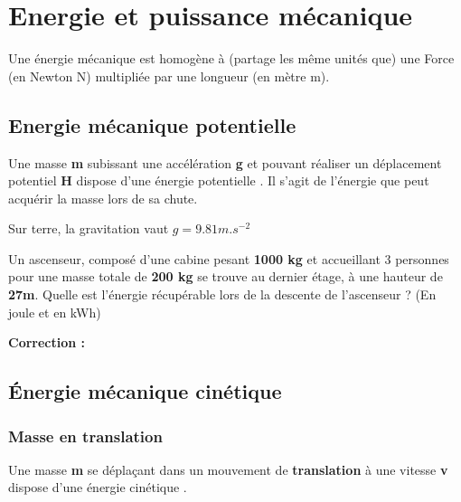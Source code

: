 \documentclass[10pt,fleqn]{article} %
\begin{document}



\section{Energie et puissance mécanique}
Une énergie mécanique est homogène à (partage les même unités que) une Force (en Newton N) multipliée par une longueur (en mètre m).
\subsection{Energie mécanique potentielle}
\begin{defi}
    Une masse \textbf{m} subissant une accélération \textbf{g} et pouvant réaliser un déplacement potentiel \textbf{H} dispose d'une énergie potentielle . Il s'agit de l'énergie que peut acquérir la masse lors de sa chute. 
\end{defi}


Sur terre, la gravitation vaut $g = 9.81 m.s^{-2}$

\begin{exemple}
    Un ascenseur, composé d'une cabine pesant \textbf{1000 kg} et accueillant 3 personnes pour une masse totale de \textbf{200 kg} se trouve au dernier étage, à une hauteur de \textbf{27m}. 
Quelle est l'énergie récupérable lors de la descente de l'ascenseur ? (En joule et en kWh) 

\afaire{}

\correction \textbf{Correction : } 
\end{exemple}


\subsection{Énergie mécanique cinétique}
\subsubsection{Masse en translation}
\begin{defi}
  Une masse \textbf{m} se déplaçant dans un mouvement de \textbf{translation} à une vitesse \textbf{v} dispose d'une énergie cinétique .   
\end{defi}
\end{document}
